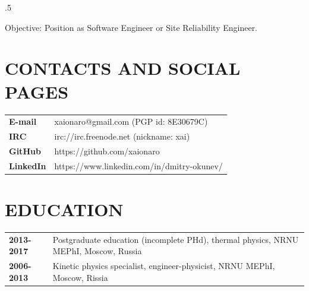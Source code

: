 \address{Limassol, Cyprus}


\begin{resume}
\vspace{0.1in}
\moveleft.5\sectionwidth\centerline{Objective: Position as Software Engineer or Site Reliability Engineer.}

\section{CONTACTS AND SOCIAL PAGES}
\vspace{0.1in} 
\begin{tabular}{ll}
 {\bf E-mail}   & xaionaro@gmail.com (PGP id: 8E30679C)\\
 {\bf IRC}      & irc://irc.freenode.net (nickname: xai)\\
 {\bf GitHub}   & https://github.com/xaionaro\\
 {\bf LinkedIn} & https://www.linkedin.com/in/dmitry-okunev/\\
\end{tabular}

\section{EDUCATION}
\vspace{0.1in} 
\begin{tabular}{ll}
 {\bf 2013-2017} & Postgraduate education (incomplete PHd), thermal physics, NRNU MEPhI, Moscow, Russia\\
 {\bf 2006-2013} & Kinetic physics specialist, engineer-physicist, NRNU MEPhI, Moscow, Rissia\\
\end{tabular}


\end{resume}
